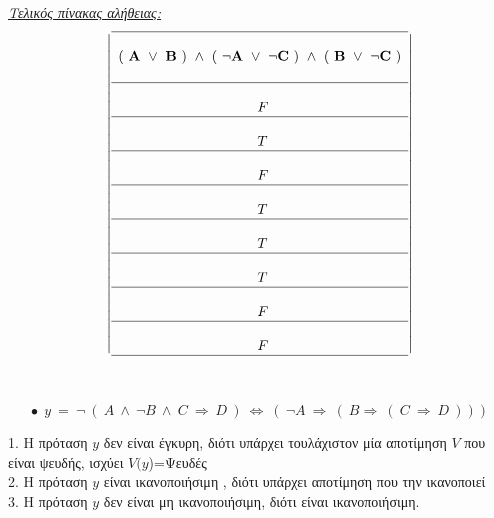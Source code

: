 \documentclass[10pt]{article}
\begin{document}
\underline{\it Τελικός πίνακας αλήθειας:}
\[ 
\left | 
\begin{array}{l}
 \hline  \\
 \bf   ( \ A \ \vee \  B \ ) \ \wedge \ ( \ \neg A \ 
\vee \ \neg C \ ) \ \wedge \ ( \ B \ \vee \ \neg C \ )
\\  \\ 
\hline \\
\hspace{35mm}F \\
\hline \\
\hspace{35mm}T \\
\hline \\
\hspace{35mm}F \\
\hline \\
\hspace{35mm}T \\
\hline \\
\hspace{35mm}T \\
\hline \\
\hspace{35mm}T \\
\hline \\
\hspace{35mm}F \\
\hline \\
\hspace{35mm}F \\
\hline
\end{array} 
\right | \] 
\\ \\
% 

\[
\bullet \ \ y \ = \  \neg \ ( \ A \ \wedge \ \neg B \ \wedge \  C \ \Rightarrow \ D \ )
\ \Leftrightarrow \ (\ \neg A \ \Rightarrow \ ( \ B \Rightarrow \ ( \ C \ \Rightarrow \ D \ ))) \]

1. Η πρόταση $y$ δεν είναι έγκυρη, διότι υπάρχει τουλάχιστον μία αποτίμηση $V$ που είναι ψευδής, ισχύει $V(y$)=Ψευδές \\

2. Η πρόταση $y$ είναι ικανοποιήσιμη , διότι υπάρχει αποτίμηση  που την ικανοποιεί\\

3. Η πρόταση $y$ δεν είναι μη ικανοποιήσιμη, διότι είναι ικανοποιήσιμη. \\
\end{document}
